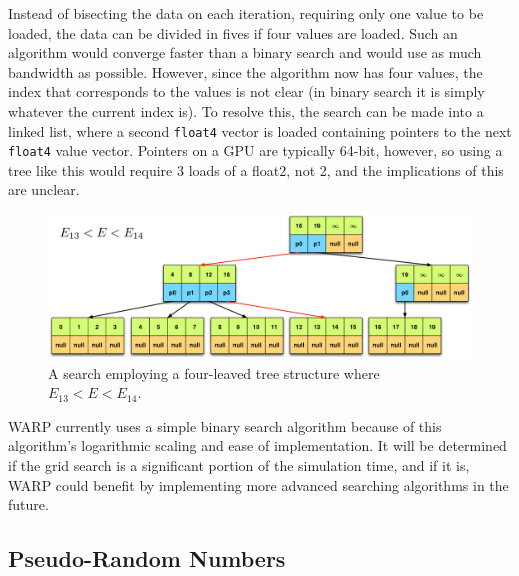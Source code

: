 Instead of bisecting the data on each iteration, requiring only one value to be loaded, the data can be divided in fives if four values are loaded.  Such an algorithm would converge faster than a binary search and would use as much bandwidth as possible.  However, since the algorithm now has four values, the index that corresponds to the values is not clear (in binary search it is simply whatever the current index is).  To resolve this, the search can be made into a linked list, where a second \lstinline{float4} vector is loaded containing pointers to the next \lstinline{float4} value vector.  Pointers on a GPU are typically 64-bit, however, so using a tree like this would require 3 loads of a float2, not 2, and the implications of this are unclear.
 

\begin{figure}[h!] 
\centering
\includegraphics[width=1.0\textwidth]{graphics/quad_tree.eps}
\caption{A search employing a four-leaved tree structure where $E_{13}<E<E_{14}$. \label{quad_tree} }%
\end{figure}

WARP currently uses a simple binary search algorithm because of this algorithm's logarithmic scaling and ease of implementation.  It will be determined if the grid search is a significant portion of the simulation time, and if it is, WARP could benefit by implementing more advanced searching algorithms in the future.

\subsection{Pseudo-Random Numbers}

